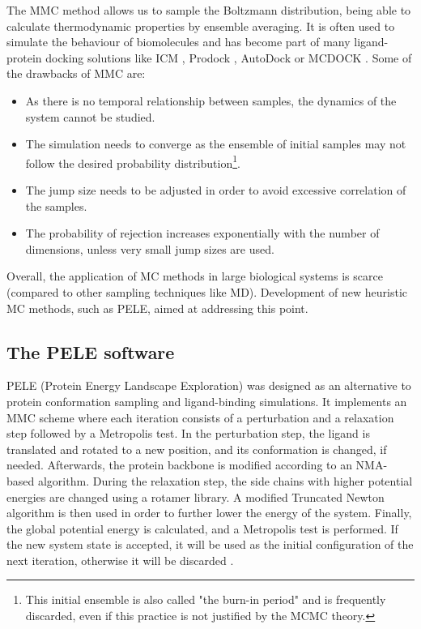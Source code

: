 The MMC method allows us to sample the Boltzmann distribution, being able to calculate thermodynamic properties by ensemble averaging. It is often used to simulate the behaviour of biomolecules and has become part of many ligand-protein docking solutions like ICM \cite{abagyan_icm_1994}, Prodock \cite{trosset_prodock_1999}, AutoDock \cite{morris_autodock4_2009} or MCDOCK \cite{liu_mcdock_1999}.
Some of the drawbacks of MMC are:
\begin{itemize}
\item As there is no temporal relationship between samples, the dynamics of the system cannot be studied. 
\item The simulation needs to converge as the ensemble of initial samples may not follow the desired probability distribution\footnote{This initial ensemble is also called "the burn-in period" and is frequently discarded, even if this practice is not justified by the MCMC theory.}. 
\item The jump size needs to be adjusted in order to avoid excessive correlation of the samples. 
\item The probability of rejection increases exponentially with the number of dimensions, unless very small jump sizes are used.
\end{itemize}

Overall, the application of MC methods in large biological systems is scarce (compared to other sampling techniques like MD). Development of new heuristic MC methods, such as PELE, aimed at addressing this point.

\subsection{The PELE software}

PELE (Protein Energy Landscape Exploration) \cite{borrelli_pele_2005-2, madadkar-sobhani_pele_2013-1} was designed as an alternative to protein conformation sampling and ligand-binding simulations. It implements an MMC scheme where each iteration consists of a perturbation and a relaxation step followed by a Metropolis test. In the perturbation step, the ligand is translated and rotated to a new position, and its conformation is changed, if needed. Afterwards, the protein backbone  is modified according to an NMA-based algorithm. During the relaxation step, the side chains with higher potential energies are changed using a rotamer library. A modified Truncated Newton algorithm \cite{schlick_tnpacktruncated_1992-1}  is then used in order to further lower the energy of the system. Finally, the global potential energy is calculated, and a Metropolis test is performed. If the new system state is accepted, it will be used as the initial configuration of the next iteration, otherwise it will be discarded . 

